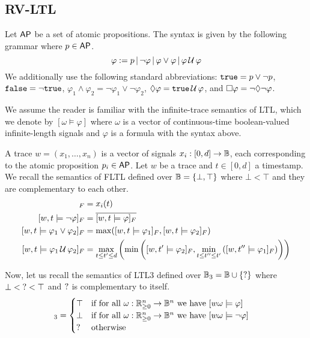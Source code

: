 \begin{example}
	\TODO
\end{example}


\subsection{RV-LTL}

Let $\mathsf{AP}$ be a set of atomic propositions.
The syntax is given by the following grammar where $p \in \mathsf{AP}$.
$$ \varphi :=  p \,|\, \lnot \varphi \,|\, \varphi \lor \varphi \,|\, \varphi \,\mathcal{U}\, \varphi $$
We additionally use the following standard abbreviations: $\texttt{true} = p \lor \lnot p$, $\texttt{false} = \lnot \texttt{true}$, $ \varphi_1 \land \varphi_2 = \lnot \varphi_1 \lor \lnot \varphi_2$, $\lozenge \varphi = \texttt{true} \,\mathcal{U}\, \varphi$, and $\square \varphi = \lnot \lozenge \lnot \varphi$.


We assume the reader is familiar with the infinite-trace semantics of LTL, which we denote by $[\omega \models \varphi]$ where $\omega$ is a vector of continuous-time boolean-valued infinite-length signals and $\varphi$ is a formula with the syntax above.

A trace $w = (x_1, \ldots, x_n)$ is a vector of signals $x_i : [0,d] \to \mathbb{B}$, each corresponding to the atomic proposition $p_i \in \mathsf{AP}$.
Let $w$ be a trace and $t \in [0,d]$ a timestamp.
We recall the semantics of FLTL defined over $\mathbb{B} = \{\bot, \top\}$ where $\bot < \top$ and they are complementary to each other. 
\begin{align*}
	[w,t \models p_i]_F &= x_i(t)\\
	[w,t \models \lnot \varphi]_F &= \overline{[w,t \models \varphi]_F}\\
	[w,t \models \varphi_1 \lor \varphi_2]_F &= \max([w,t \models \varphi_1]_F, [w,t \models \varphi_2]_F)\\
	[w,t \models \varphi_1 \until \varphi_2]_F &= \max_{t \leq t' \leq d} \left( \min \left( [w,t' \models \varphi_2]_F, \min_{t \leq t'' \leq t'} \left( [w,t'' \models \varphi_1]_F \right) \right) \right)\\
\end{align*}

Now, let us recall the semantics of LTL3 defined over $\mathbb{B}_3 = \mathbb{B} \cup \{\text{?}\}$ where $\bot < \text{?} < \top$ and $\text{?}$ is complementary to itself. %
\begin{align*}
	[w,t \models \varphi]_3 &= \begin{cases}
		\top &\text{if for all } \omega : \R_{\geq 0}^n \to \B^n \text{ we have } [w \omega \models \varphi]\\
		\bot &\text{if for all } \omega : \R_{\geq 0}^n \to \B^n \text{ we have } [w \omega \models \lnot \varphi]\\
		\? &\text{otherwise}\\
	\end{cases}
\end{align*}

